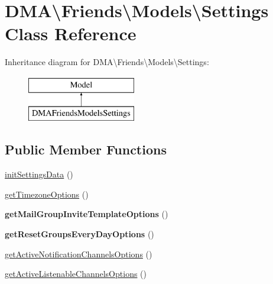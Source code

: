 \hypertarget{classDMA_1_1Friends_1_1Models_1_1Settings}{\section{D\-M\-A\textbackslash{}Friends\textbackslash{}Models\textbackslash{}Settings Class Reference}
\label{classDMA_1_1Friends_1_1Models_1_1Settings}
}
Inheritance diagram for D\-M\-A\textbackslash{}Friends\textbackslash{}Models\textbackslash{}Settings\-:\begin{figure}[H]
\begin{center}
\leavevmode
\includegraphics[height=2.000000cm]{d1/d8a/classDMA_1_1Friends_1_1Models_1_1Settings}
\end{center}
\end{figure}
\subsection*{Public Member Functions}
\begin{DoxyCompactItemize}
\item 
\hyperlink{classDMA_1_1Friends_1_1Models_1_1Settings_a182b5e2b83cfc057c1cd31499ad9e244}{init\-Settings\-Data} ()
\item 
\hyperlink{classDMA_1_1Friends_1_1Models_1_1Settings_a347eae65e8aeb114767d5e4fc8542fea}{get\-Timezone\-Options} ()
\item 
\hypertarget{classDMA_1_1Friends_1_1Models_1_1Settings_aafef2e58559c6053550fe133b900246b}{{\bfseries get\-Mail\-Group\-Invite\-Template\-Options} ()}\label{classDMA_1_1Friends_1_1Models_1_1Settings_aafef2e58559c6053550fe133b900246b}

\item 
\hypertarget{classDMA_1_1Friends_1_1Models_1_1Settings_ac88752cae719c48bde66c9cb2f945952}{{\bfseries get\-Reset\-Groups\-Every\-Day\-Options} ()}\label{classDMA_1_1Friends_1_1Models_1_1Settings_ac88752cae719c48bde66c9cb2f945952}

\item 
\hyperlink{classDMA_1_1Friends_1_1Models_1_1Settings_a8c2bad0fb18f5e501d3318eba7379609}{get\-Active\-Notification\-Channels\-Options} ()
\item 
\hyperlink{classDMA_1_1Friends_1_1Models_1_1Settings_a140721a33440c666426139d6317bd357}{get\-Active\-Listenable\-Channels\-Options} ()
\end{DoxyCompactItemize}
